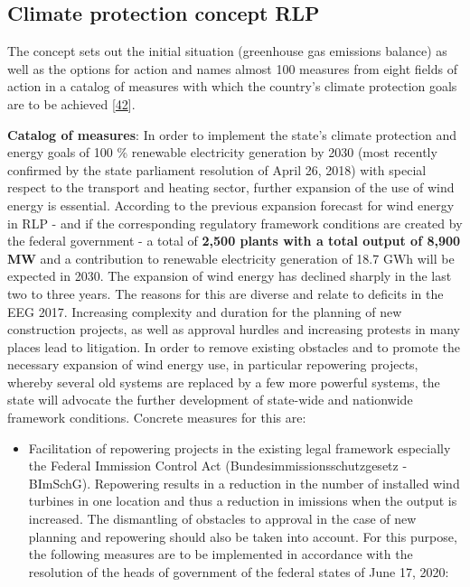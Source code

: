 \documentclass[a4paper,11pt]{article}
\providecommand{\tightlist}{%
  \setlength{\itemsep}{0pt}\setlength{\parskip}{0pt}}
\begin{document}
\hypertarget{climate-protection-concept-rlp}{%
\subsection{Climate protection concept RLP}\label{climate-protection-concept-rlp}}

The concept sets out the initial situation (greenhouse gas emissions balance) as well as the options for action and names almost 100 measures from eight fields of action in a catalog of measures with which the country's climate protection goals are to be achieved {[}\protect\hyperlink{ref-MinisteriumfurUmweltEnergieErnahrungundForsten.2020b}{42}{]}.

\textbf{Catalog of measures}: In order to implement the state's climate protection and energy goals of 100 \% renewable electricity generation by 2030 (most recently confirmed by the state parliament resolution of April 26, 2018) with special respect to the transport and heating sector, further expansion of the use of wind energy is essential. According to the previous expansion forecast for wind energy in RLP - and if the corresponding regulatory framework conditions are created by the federal government - a total of \textbf{2,500 plants with a total output of 8,900 MW} and a contribution to renewable electricity generation of 18.7 GWh will be expected in 2030. The expansion of wind energy has declined sharply in the last two to three years. The reasons for this are diverse and relate to deficits in the EEG 2017. Increasing complexity and duration for the planning of new construction projects, as well as approval hurdles and increasing protests in many places lead to litigation. In order to remove existing obstacles and to promote the necessary expansion of wind energy use, in particular repowering projects, whereby several old systems are replaced by a few more powerful systems, the state will advocate the further development of state-wide and nationwide framework conditions. Concrete measures for this are:
\begin{itemize}
\tightlist
\item
  Facilitation of repowering projects in the existing legal framework especially the Federal Immission Control Act (Bundesimmissionsschutzgesetz - BImSchG). Repowering results in a reduction in the number of installed wind turbines in one location and thus a reduction in imissions when the output is increased. The dismantling of obstacles to approval in the case of new planning and repowering should also be taken into account.
  For this purpose, the following measures are to be implemented in accordance with the resolution of the heads of government of the federal states of June 17, 2020:
\end{itemize}
\end{document}
